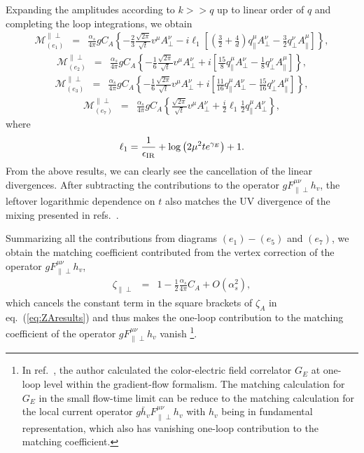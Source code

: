 Expanding the amplitudes according to $k >> q$ up to linear order of $q$ and completing the loop integrations, we obtain
\begin{eqnarray}
\label{eq:e1pperpexpand}
\mathcal{M}_{(e_1)}^{\|\perp}
&=& \frac{\alpha_s}{4\pi}gC_A\left\{ -\frac{2}{3}\frac{\sqrt{2\pi}}{\sqrt{t}}v^{\mu}A_{\perp}^{\nu} - i \ell_1 \left[\left(\frac{3}{2} + \frac{4}{d}\right)q^{\mu}_{\|} A_{\perp}^{\nu}-\frac{3}{2}q^{\nu}_{\perp} A^{\mu}_{\|}\right]\right\},
\end{eqnarray}
\begin{eqnarray}
\label{eq:e2pperpexpand}
\mathcal{M}_{(e_2)}^{\|\perp} 
&=& \frac{\alpha_s}{4\pi}gC_A\left\{ -\frac{1}{6}\frac{\sqrt{2\pi}}{\sqrt{t}}v^{\mu}A_{\perp}^{\nu} + i \left[\frac{15}{8}q^{\mu}_{\|} A_{\perp}^{\nu}-\frac{1}{8}q^{\nu}_{\perp} A^{\mu}_{\|}\right]\right\},
\end{eqnarray}
\begin{eqnarray}
\label{eq:e3pperpexpand}
\mathcal{M}_{(e_3)}^{\|\perp}
&=& \frac{\alpha_s}{4\pi}gC_A\left\{ -\frac{1}{6}\frac{\sqrt{2\pi}}{\sqrt{t}}v^{\mu}A_{\perp}^{\nu} + i \left[\frac{11}{16}q^{\mu}_{\|} A_{\perp}^{\nu}-\frac{15}{16}q^{\nu}_{\perp} A^{\mu}_{\|}\right]\right\},
\end{eqnarray}
\begin{eqnarray}
\label{eq:e7pperpexpand}
\mathcal{M}_{(e_7)}^{\|\perp}
&=& \frac{\alpha_s}{4\pi}gC_A\left\{\frac{\sqrt{2\pi}}{\sqrt{t}}v^{\mu}A_{\perp}^{\nu} + \frac{i}{2} \ell_1\frac{1}{2}q^{\mu}_{\|} A_{\perp}^{\nu}\right\},
\end{eqnarray}
where 
\begin{eqnarray}
\ell_1 = \frac{1}{\epsilon_{\rm IR}}+\log\left(2\mu^2 te^{\gamma_E}\right) +1.
\end{eqnarray}
From the above results, we can clearly see the cancellation of the linear divergences. After subtracting the contributions to the operator $gF^{\mu\nu}_{\|\perp}h_v$, the leftover logarithmic dependence on $t$ also matches the UV divergence of the mixing presented in refs.~\cite{Dorn:1981wa,Zhang:2018diq,Wang:2019tgg}.

Summarizing all the contributions from diagrams $(e_1) - (e_5)$ and $(e_7)$, we obtain the matching coefficient contributed from the vertex correction of the operator $gF^{\mu\nu}_{\|\perp}h_v$,
\begin{eqnarray} 
\label{eq:resultgluonvertexpperp}
\zeta_{\|\perp} &=& 1 -\frac{1}{2}\frac{\alpha_s}{4\pi}C_A+ O(\alpha_s^2),
\end{eqnarray}
which cancels the constant term in the square brackets of $\zeta_{A}$ in eq.~(\ref{eq:ZAresults}) and thus makes the one-loop contribution to the matching coefficient of the operator $gF^{\mu\nu}_{\|\perp}h_v$ vanish \footnote{In ref.~\cite{Eller:2021qpp}, the author calculated the color-electric field correlator $G_E$ at one-loop level within the gradient-flow formalism. The matching calculation for $G_E$ in the small flow-time limit can be reduce to the matching calculation for the local current operator $g\bar{h}_vF^{\mu\nu}_{\|\perp}h_v$ with $h_v$ being in fundamental representation, which also has vanishing one-loop contribution to the matching coefficient.}.
 

